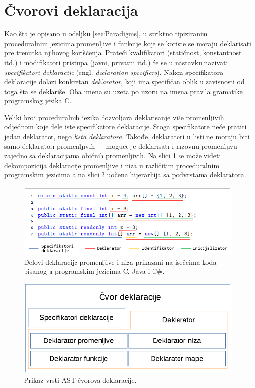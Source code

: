\section{Čvorovi deklaracija}
\label{sec:MyASTDeclarationNodes}

Kao što je opisano u odeljku \ref{sec:Paradigms}, u striktno tipiziranim proceduralnim jezicima promenljive i funkcije koje se koriste se moraju deklarisati pre trenutka njihovog korišćenja. Prateći kvalifikatori (statičnost, konstantnost itd.) i modifikatori pristupa (javni, privatni itd.) će se u nastavku nazivati \emph{specifikatori deklaracije} (engl. \emph{declaration specifiers}). Nakon specifikatora deklaracije dolazi konkretan \emph{deklarator}, koji ima specifičan oblik u zavisnosti od toga šta se deklariše. Oba imena su uzeta po uzoru na imena pravila gramatike programskog jezika C. 

Veliki broj proceduralnih jezika dozvoljava deklarisanje više promenljivih odjednom koje dele iste specifikatore deklaracije. Stoga specifikatore neće pratiti jedan deklarator, nego \emph{lista deklaratora}. Takođe, deklaratori u listi ne moraju biti samo deklaratori promenljivih --- moguće je deklarisati i nizovnu promenljivu zajedno sa deklaracijama običnih promenljivih. Na slici \ref{fig:DeclarationParts} se može videti dekompozicija deklaracije promenljive i niza u različitim proceduralnim programskim jezicima a na slici \ref{fig:DeclarationNodes} uočena hijerarhija sa podvrstama deklaratora.

\begin{figure}[h!]
\centering
\includegraphics[scale=0.8]{images/declaration_decomposition.png}
\caption{Delovi deklaracije promenljive i niza prikazani na isečcima koda pisanog u programskim jezicima C, Java i C\#.}
\label{fig:DeclarationParts}
\end{figure}

\begin{figure}[h!]
\centering
\includegraphics[scale=0.5]{images/declaration_nodes.png}
\caption{Prikaz vrsti AST čvorova deklaracije.}
\label{fig:DeclarationNodes}
\end{figure}

